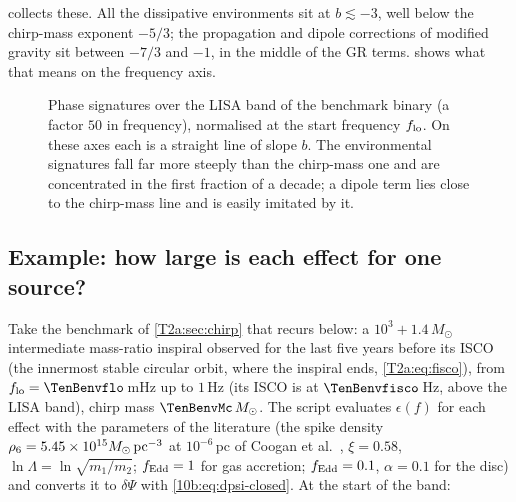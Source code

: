  collects these. All the dissipative environments sit at $b\lesssim-3$, well below the
chirp-mass exponent $-5/3$; the propagation and dipole corrections of modified gravity sit between $-7/3$ and $-1$,
in the middle of the GR terms.  shows what that means on the frequency axis.

\begin{figure}[htbp]
\centering
{}
\caption{Phase signatures over the LISA band of the benchmark binary (a factor $50$ in frequency), normalised at the
start frequency $f_{\rm lo}$. On these axes each is a straight line of slope $b$. The environmental signatures fall
far more steeply than the chirp-mass one and are concentrated in the first fraction of a decade; a dipole term lies
close to the chirp-mass line and is easily imitated by it.}
\label{10b:fig:signatures}
\end{figure}

\subsection{Example: how large is each effect for one source?}
\label{10b:sec:env-example}

Take the benchmark of \cref{T2a:sec:chirp} that recurs below: a $10^3+1.4\,M_\odot$ intermediate mass-ratio inspiral
observed for the last five years before its ISCO (the innermost stable circular orbit, where the inspiral ends,
\cref{T2a:eq:fisco}), from $f_{\rm lo}=\TenBenvflo$\,mHz up to $1$\,Hz (its ISCO is at
$\TenBenvfisco$\,Hz, above the LISA band), chirp mass $\TenBenvMc\,M_\odot$. The script 
evaluates $\epsilon(f)$ for each effect with the parameters of the literature (the spike density
$\rho_6=5.45\times10^{15}M_\odot\,{\rm pc}^{-3}$ at $10^{-6}$\,pc of Coogan et al.\ \cite{Coogan2022}, $\xi=0.58$,
$\ln\Lambda=\ln\sqrt{m_1/m_2}$; $f_{\rm Edd}=1$ for gas accretion; $f_{\rm Edd}=0.1$, $\alpha=0.1$ for the disc) and
converts it to $\delta\Psi$ with \eqref{10b:eq:dpsi-closed}. At the start of the band:

